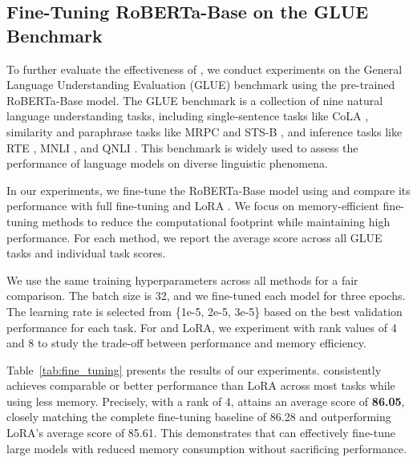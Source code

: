 \vspace{-2mm}

\subsection{Fine-Tuning RoBERTa-Base on the GLUE Benchmark}

To further evaluate the effectiveness of \textit{\lowrank}, we conduct experiments on the General Language Understanding Evaluation (GLUE) benchmark using the pre-trained RoBERTa-Base model. The GLUE benchmark is a collection of nine natural language understanding tasks, including single-sentence tasks like CoLA \citep{warstadt2019neural}, similarity and paraphrase tasks like MRPC \citep{dolan2005automatically} and STS-B \citep{cer2017semeval}, and inference tasks like RTE \citep{dagan2005pascal}, MNLI \citep{williams2018broad}, and QNLI \citep{rajpurkar2016squad}. This benchmark is widely used to assess the performance of language models on diverse linguistic phenomena.

In our experiments, we fine-tune the RoBERTa-Base model using \textit{\lowrank} and compare its performance with full fine-tuning and LoRA \citep{hu2021lora}. We focus on memory-efficient fine-tuning methods to reduce the computational footprint while maintaining high performance. For each method, we report the average score across all GLUE tasks and individual task scores.

We use the same training hyperparameters across all methods for a fair comparison. The batch size is 32, and we fine-tuned each model for three epochs. The learning rate is selected from \{1e-5, 2e-5, 3e-5\} based on the best validation performance for each task. For \textit{\lowrank} and LoRA, we experiment with rank values of 4 and 8 to study the trade-off between performance and memory efficiency.

Table~\ref{tab:fine_tuning} presents the results of our experiments. \textit{\lowrank} consistently achieves comparable or better performance than LoRA across most tasks while using less memory. Precisely, with a rank of 4, \textit{\lowrank} attains an average score of \textbf{86.05}, closely matching the complete fine-tuning baseline of 86.28 and outperforming LoRA's average score of 85.61. This demonstrates that \textit{\lowrank} can effectively fine-tune large models with reduced memory consumption without sacrificing performance.



